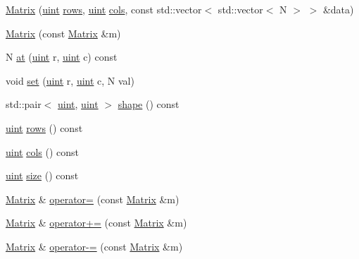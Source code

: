 \begin{DoxyCompactItemize}
\hyperlink{classmath_1_1Matrix_a24b2432d600be2a86a1912f2e6e51f7a}{Matrix} (\hyperlink{typedefs_8h_a7b9b9413622e67b9df7f2d090b48682b}{uint} \hyperlink{classmath_1_1Matrix_a602173645d806afe305ed77b1ff38273}{rows}, \hyperlink{typedefs_8h_a7b9b9413622e67b9df7f2d090b48682b}{uint} \hyperlink{classmath_1_1Matrix_ad78b49e12a607856df124a18a855aaf1}{cols}, const std\+::vector$<$ std\+::vector$<$ N $>$ $>$ \&data)
\item 
\hyperlink{classmath_1_1Matrix_a24169476532305f1bb8229653274a5ba}{Matrix} (const \hyperlink{classmath_1_1Matrix}{Matrix} \&m)
\item 
N \hyperlink{classmath_1_1Matrix_aac510ef186a6bbf176d0ef4d79a7c666}{at} (\hyperlink{typedefs_8h_a7b9b9413622e67b9df7f2d090b48682b}{uint} r, \hyperlink{typedefs_8h_a7b9b9413622e67b9df7f2d090b48682b}{uint} c) const
\item 
void \hyperlink{classmath_1_1Matrix_afbf9ebd6114faec44e9eccb553ca8f33}{set} (\hyperlink{typedefs_8h_a7b9b9413622e67b9df7f2d090b48682b}{uint} r, \hyperlink{typedefs_8h_a7b9b9413622e67b9df7f2d090b48682b}{uint} c, N val)
\item 
std\+::pair$<$ \hyperlink{typedefs_8h_a7b9b9413622e67b9df7f2d090b48682b}{uint}, \hyperlink{typedefs_8h_a7b9b9413622e67b9df7f2d090b48682b}{uint} $>$ \hyperlink{classmath_1_1Matrix_afbbadd025c9d60f4447cee97fd7c727d}{shape} () const
\item 
\hyperlink{typedefs_8h_a7b9b9413622e67b9df7f2d090b48682b}{uint} \hyperlink{classmath_1_1Matrix_a602173645d806afe305ed77b1ff38273}{rows} () const
\item 
\hyperlink{typedefs_8h_a7b9b9413622e67b9df7f2d090b48682b}{uint} \hyperlink{classmath_1_1Matrix_ad78b49e12a607856df124a18a855aaf1}{cols} () const
\item 
\hyperlink{typedefs_8h_a7b9b9413622e67b9df7f2d090b48682b}{uint} \hyperlink{classmath_1_1Matrix_ae99135c51efc0077b694ab37ad64d5c0}{size} () const
\item 
\hyperlink{classmath_1_1Matrix}{Matrix} \& \hyperlink{classmath_1_1Matrix_a8bf5d371b703ef3023742c4058f709a7}{operator=} (const \hyperlink{classmath_1_1Matrix}{Matrix} \&m)
\item 
\hyperlink{classmath_1_1Matrix}{Matrix} \& \hyperlink{classmath_1_1Matrix_ae2944c1e1a0f1958101db2197bcfaa3c}{operator+=} (const \hyperlink{classmath_1_1Matrix}{Matrix} \&m)
\item 
\hyperlink{classmath_1_1Matrix}{Matrix} \& \hyperlink{classmath_1_1Matrix_a046b9f4717da34fb08795cb461497084}{operator-\/=} (const \hyperlink{classmath_1_1Matrix}{Matrix} \&m)

\end{DoxyCompactItemize}
